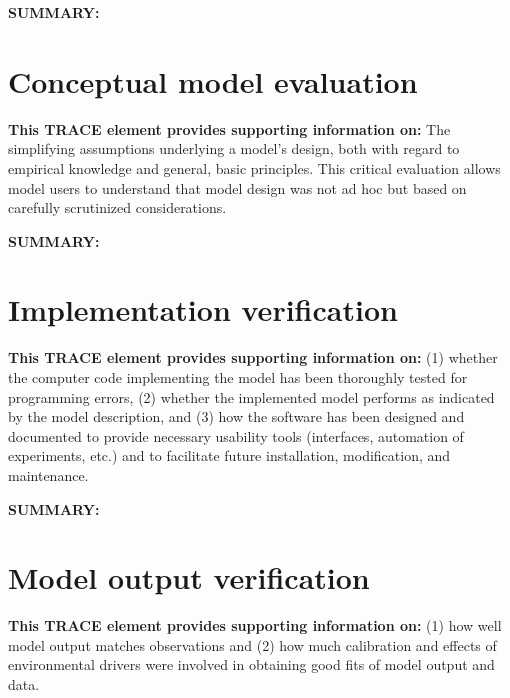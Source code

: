 \documentclass[a4paper, 11pt]{scrartcl}
\begin{document}
\textbf{SUMMARY:}
\begin{addmargin}[3em]{2em}
\textbf{

}
\end{addmargin}



\clearpage
\section{Conceptual model evaluation}
\textbf{This TRACE element provides supporting information on:} The simplifying assumptions underlying a model's
design, both  with regard to empirical knowledge and general, basic principles. This critical evaluation allows model
users to understand that model design was not ad hoc but based on carefully scrutinized considerations.

\textbf{SUMMARY:}
\begin{addmargin}[3em]{2em}
\textbf{

}
\end{addmargin}



\clearpage
\section{Implementation verification}
\textbf{This TRACE element provides supporting information on:} (1) whether the computer code implementing the model
has been thoroughly tested for programming errors, (2) whether the implemented model performs as indicated by the model
description, and (3) how the software has been designed and documented to provide necessary usability tools
(interfaces, automation of experiments, etc.) and to facilitate future installation, modification, and maintenance.

\textbf{SUMMARY:}
\begin{addmargin}[3em]{2em}
\textbf{

}
\end{addmargin}



\clearpage
\section{Model output verification}
\textbf{This TRACE element provides supporting information on:} (1) how well model output matches observations and
(2) how much calibration and effects of environmental drivers were involved in obtaining good fits of model output
and data.
\end{document}

